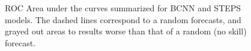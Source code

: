\begin{figure}[ht]
	\centering
	
	
	\caption{ROC Area under the curves summarized for BCNN and STEPS models. The dashed lines correspond to a random forecasts, and grayed out areas to results worse than that of a random (no skill) forecast.}
	\label{fig:roc_auc}
\end{figure}

